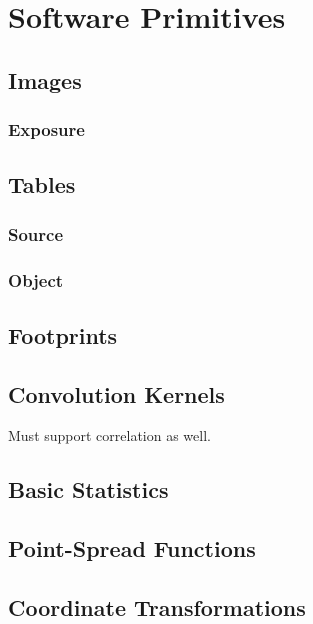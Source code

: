 \section{Software Primitives}
\label{sec:software-primitives}

\subsection{Images}
\label{sec:spImages}

\subsubsection{Exposure}
\label{sec:spImagesExposure}

\subsection{Tables}
\label{sec:spTables}

\subsubsection{Source}
\label{sec:spTablesSource}

\subsubsection{Object}
\label{sec:spTablesObject}

\subsection{Footprints}
\label{sec:spFootprints}

\subsection{Convolution Kernels}
\label{sec:spKernels}
Must support correlation as well.

\subsection{Basic Statistics}
\label{sec:spStatistics}

\subsection{Point-Spread Functions}
\label{sec:spPSF}

\subsection{Coordinate Transformations}
\label{sec:spWCS}

